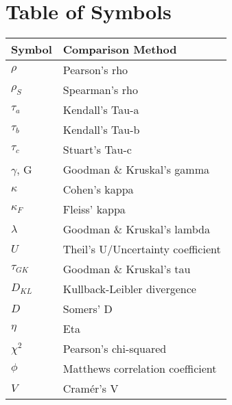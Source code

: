 \documentclass[11pt]{article}
\begin{document}
\section{Table of Symbols}
\begin{table}[h]
\centering
\begin{tabular}{|l|l|}
\hline
\textbf{Symbol} & \textbf{Comparison Method} \\ \hline
$\rho$              & Pearson's rho 
\\ \hline

$\rho_S$            & Spearman's rho 
\\ \hline

$\tau_a$            & Kendall's Tau-a 
\\ \hline

$\tau_b$            & Kendall's Tau-b 
\\ \hline

$\tau_c$            & Stuart's Tau-c 
\\ \hline

$\gamma$, G         & Goodman \& Kruskal's gamma
\\ \hline

$\kappa$            & Cohen's kappa 
\\ \hline

$\kappa_F$          & Fleiss' kappa 
\\ \hline

$\lambda$           & Goodman \& Kruskal's lambda
\\ \hline

$U$                 & Theil's U/Uncertainty coefficient
\\ \hline

$\tau_{GK}$         & Goodman \& Kruskal's tau
\\ \hline

$D_{KL}$            & Kullback-Leibler divergence
\\ \hline

$D$                 & Somers' D
\\ \hline

$\eta$              & Eta 
\\ \hline

$\chi^2$            & Pearson's chi-squared
\\ \hline

$\phi$              & Matthews correlation coefficient
\\ \hline

$V$                 & Cram\'er's V
\\ \hline


\end{tabular}
\end{table}
\end{document}
